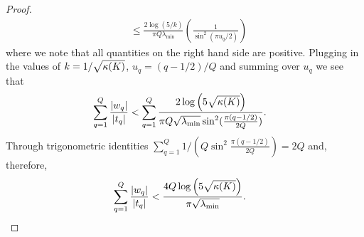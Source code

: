 \begin{proof}
\begin{align*}
    &\leq \frac{2\log( 5 / k)}{\pi Q \lambda_{\min}}\left(\frac{1}{\sin^2( \pi u_q /2 )} \right)
  \end{align*}
  where we note that all quantities on the right hand side are positive.
  Plugging in the values of $k = 1/\sqrt{\kappa{(\ensuremath{K})}}$, $u_q = (q-1/2)/Q$ and summing over $u_q$ we see that
  \begin{align}
    \sum_{q=1}^Q \frac{|w_q|}{|t_q|}
    &<
    \sum_{q=1}^Q \frac{ 2 \log \left( 5 \sqrt{\kappa(K)} \right)}
    { \pi Q \sqrt{\lambda_\text{min}} \sin^2 ( \frac{\pi (q - 1/2)}{2Q}) }.
  \end{align}
  Through trigonometric identities
  $\sum_{q=1}^Q 1 / ( Q \sin^2 \frac{\pi(q- 1/2 )}{2Q} )  = 2 Q$ and, therefore,
  \begin{align*}
    \sum_{q=1}^Q \frac{|w_q|}{|t_q|}
    &< \frac{4 Q \log \left( 5 \sqrt{\kappa(K)} \right)}{\pi \sqrt{\lambda_\text{min}}}.
  \end{align*}
\end{proof}







